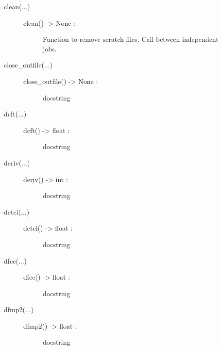 \documentclass[letterpaper,10pt,english]{sphinxmanual}
\begin{document}
\begin{description}
\begin{description}
\begin{description}
\end{description}

\item[{clean(...)}] \leavevmode\begin{description}
\item[{clean() -\textgreater{} None :}] \leavevmode
Function to remove scratch files. Call between independent jobs.

\end{description}

\item[{close\_outfile(...)}] \leavevmode\begin{description}
\item[{close\_outfile() -\textgreater{} None :}] \leavevmode
docstring

\end{description}

\item[{dcft(...)}] \leavevmode\begin{description}
\item[{dcft() -\textgreater{} float :}] \leavevmode
docstring

\end{description}

\item[{deriv(...)}] \leavevmode\begin{description}
\item[{deriv() -\textgreater{} int :}] \leavevmode
docstring

\end{description}

\item[{detci(...)}] \leavevmode\begin{description}
\item[{detci() -\textgreater{} float :}] \leavevmode
docstring

\end{description}

\item[{dfcc(...)}] \leavevmode\begin{description}
\item[{dfcc() -\textgreater{} float :}] \leavevmode
docstring

\end{description}

\item[{dfmp2(...)}] \leavevmode\begin{description}
\item[{dfmp2() -\textgreater{} float :}] \leavevmode
docstring


\end{description}
\end{description}
\end{description}
\end{document}
